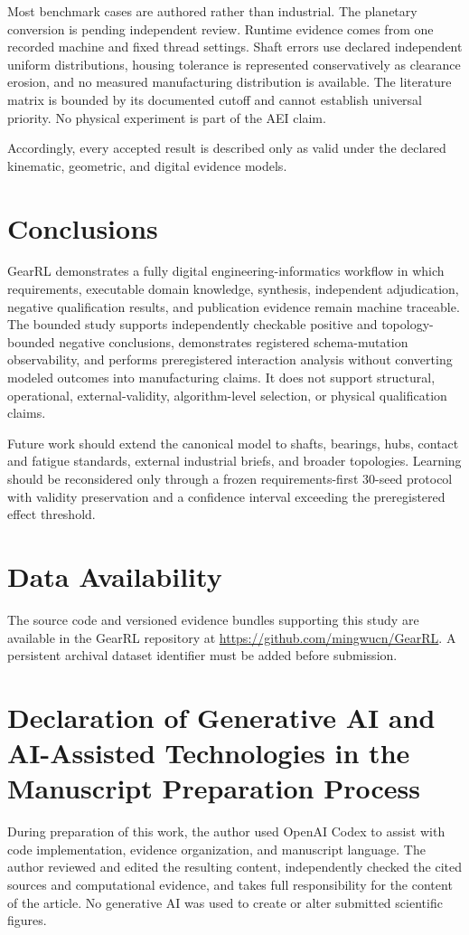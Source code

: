 \documentclass[preprint,12pt]{elsarticle}
\begin{document}
Most benchmark cases are authored rather than industrial. The planetary conversion is pending independent review. Runtime evidence comes from one recorded machine and fixed thread settings. Shaft errors use declared independent uniform distributions, housing tolerance is represented conservatively as clearance erosion, and no measured manufacturing distribution is available. The literature matrix is bounded by its documented cutoff and cannot establish universal priority. No physical experiment is part of the AEI claim.

Accordingly, every accepted result is described only as valid under the declared kinematic, geometric, and digital evidence models.

\section{Conclusions}
GearRL demonstrates a fully digital engineering-informatics workflow in which requirements, executable domain knowledge, synthesis, independent adjudication, negative qualification results, and publication evidence remain machine traceable. The bounded study supports independently checkable positive and topology-bounded negative conclusions, demonstrates registered schema-mutation observability, and performs preregistered interaction analysis without converting modeled outcomes into manufacturing claims. It does not support structural, operational, external-validity, algorithm-level selection, or physical qualification claims.

Future work should extend the canonical model to shafts, bearings, hubs, contact and fatigue standards, external industrial briefs, and broader topologies. Learning should be reconsidered only through a frozen requirements-first 30-seed protocol with validity preservation and a confidence interval exceeding the preregistered effect threshold.

\section{Data Availability}
The source code and versioned evidence bundles supporting this study are available in the GearRL repository at \url{https://github.com/mingwucn/GearRL}. A persistent archival dataset identifier must be added before submission.

\section{Declaration of Generative AI and AI-Assisted Technologies in the Manuscript Preparation Process}
During preparation of this work, the author used OpenAI Codex to assist with code implementation, evidence organization, and manuscript language. The author reviewed and edited the resulting content, independently checked the cited sources and computational evidence, and takes full responsibility for the content of the article. No generative AI was used to create or alter submitted scientific figures.
\end{document}
